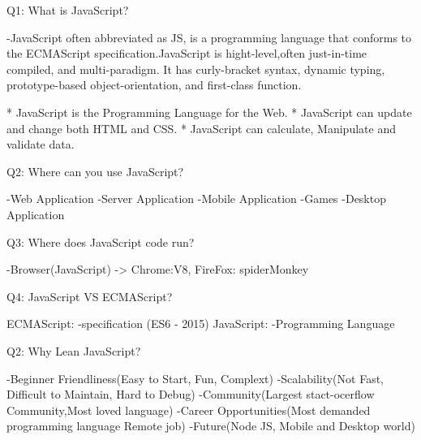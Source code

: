 Q1: What is JavaScript?

    -JavaScript often abbreviated as JS, is a programming language that conforms to the ECMAScript specification.JavaScript is hight-level,often just-in-time compiled, and multi-paradigm. It has curly-bracket syntax, dynamic typing, prototype-based object-orientation, and first-class function.

    * JavaScript is the Programming Language for the Web.
    * JavaScript can update and change both HTML and CSS.
    * JavaScript can calculate, Manipulate and validate  data.


Q2: Where can you use JavaScript?

    -Web Application
    -Server Application
    -Mobile Application
    -Games
    -Desktop Application

Q3: Where does JavaScript code run?

    -Browser(JavaScript) -> Chrome:V8, FireFox: spiderMonkey

Q4: JavaScript VS ECMAScript?

    ECMAScript:
        -specification (ES6 - 2015)
    JavaScript:
        -Programming Language

Q2: Why Lean JavaScript?

    -Beginner Friendliness(Easy to Start, Fun, Complext)
    -Scalability(Not Fast, Difficult to Maintain, Hard to Debug)
    -Community(Largest stact-ocerflow Community,Most loved language)
    -Career Opportunities(Most demanded programming language Remote job)
    -Future(Node JS, Mobile and Desktop world)

